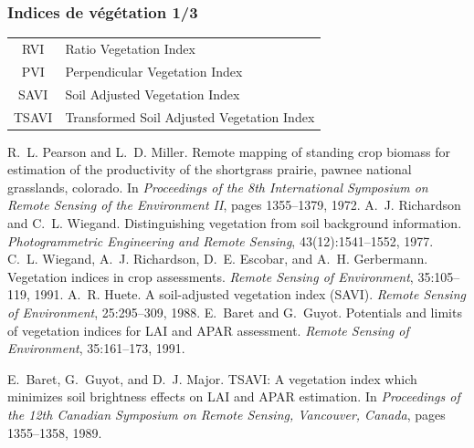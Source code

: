 \documentclass[compress,handout]{beamer}
\begin{document}
\begin{frame}
\frametitle{Indices de végétation 1/3}
\footnotesize  \centering
\begin{tabular}{|c|l|}
\hline
RVI &  Ratio Vegetation Index \cite{Pearson1972-RVI}\\
PVI & Perpendicular Vegetation Index \cite{Richardson1977-PVI,Wiegand1991-PVI}\\ 
SAVI & Soil Adjusted Vegetation Index \cite{Huete1988-SAVI} \\
TSAVI & Transformed Soil Adjusted Vegetation Index \cite{Baret1989-TSAVI,Baret1991-TSAVI} \\
\hline
\end{tabular}
\begin{thebibliography}{noidea}
\tiny
{}
R.~L. Pearson and L.~D. Miller. Remote mapping of standing crop biomass for estimation of the
  productivity of the shortgrass prairie, pawnee national grasslands,
        colorado.  In {\em Proceedings of the 8th International Symposium on Remote
  Sensing of the Environment II}, pages 1355--1379, 1972.
A.~J. Richardson and C.~L. Wiegand.
 Distinguishing vegetation from soil background information.
 {\em Photogrammetric Engineering and Remote Sensing},
  43(12):1541--1552, 1977.
C.~L. Wiegand, A.~J. Richardson, D.~E. Escobar, and A.~H. Gerbermann.
 Vegetation indices in crop assessments.
 {\em Remote Sensing of Environment}, 35:105--119, 1991.
A.~R. Huete.
 A soil-adjusted vegetation index ({SAVI}).
 {\em Remote Sensing of Environment}, 25:295--309, 1988.
E.~Baret and G.~Guyot.
 Potentials and limits of vegetation indices for {LAI} and {APAR}
  assessment.
 {\em Remote Sensing of Environment}, 35:161--173, 1991.

E.~Baret, G.~Guyot, and D.~J. Major.
 {TSAVI}: A vegetation index which minimizes soil brightness effects
  on {LAI} and {APAR} estimation.
 In {\em Proceedings of the 12th Canadian Symposium on Remote Sensing,
  Vancouver, Canada}, pages 1355--1358, 1989.
\end{thebibliography}
\end{frame}
\end{document}
